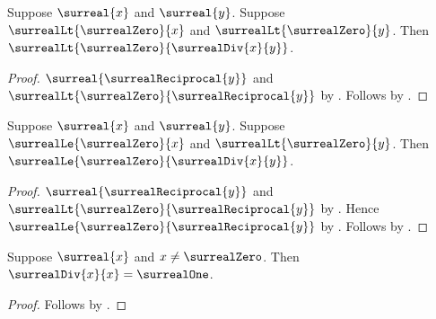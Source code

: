 \begin{theorem}\label{surreal_division_positive}
    Suppose $\surreal{x}$ and $\surreal{y}$.
    Suppose $\surrealLt{\surrealZero}{x}$ and
        $\surrealLt{\surrealZero}{y}$.
    Then $\surrealLt{\surrealZero}{\surrealDiv{x}{y}}$.
\end{theorem}
\begin{proof}
    $\surreal{\surrealReciprocal{y}}$ and
        $\surrealLt{\surrealZero}{\surrealReciprocal{y}}$
        by
        .
    Follows by .
\end{proof}

\begin{theorem}\label{surreal_division_nonnegative}
    Suppose $\surreal{x}$ and $\surreal{y}$.
    Suppose $\surrealLe{\surrealZero}{x}$ and
        $\surrealLt{\surrealZero}{y}$.
    Then $\surrealLe{\surrealZero}{\surrealDiv{x}{y}}$.
\end{theorem}
\begin{proof}
    $\surreal{\surrealReciprocal{y}}$ and
        $\surrealLt{\surrealZero}{\surrealReciprocal{y}}$
        by
        .
    Hence $\surrealLe{\surrealZero}{\surrealReciprocal{y}}$
        by .
    Follows by
        .
\end{proof}

\begin{corollary}\label{surreal_division_self}
    Suppose $\surreal{x}$ and $x\neq\surrealZero$.
    Then $\surrealDiv{x}{x}=\surrealOne$.
\end{corollary}
\begin{proof}
    Follows by .
\end{proof}

